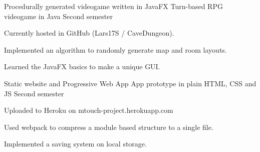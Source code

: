 

\begin{cventries}

\cventry
    {Procedurally generated videogame written in JavaFX} %
    {Turn-based RPG videogame in Java} %
    {Second semester} %
    {}
    {
      \begin{cvitems} %
        \item {Currently hosted in GitHub (Lars17S / CaveDungeon).}
        \item {Implemented an algorithm to randomly generate map and room layouts.}
        \item {Learned the JavaFX basics to make a unique GUI.}
      \end{cvitems}
    }
\cventry
    {Static website and Progressive Web App} %
    {App prototype in plain HTML, CSS and JS} %
    {Second semester} %
    {}
    {
      \begin{cvitems} %
        \item {Uploaded to Heroku on mtouch-project.herokuapp.com}
        \item {Used webpack to compress a module based structure to a single file.}
        \item {Implemented a saving system on local storage.}
      \end{cvitems}
    }

\end{cventries}

